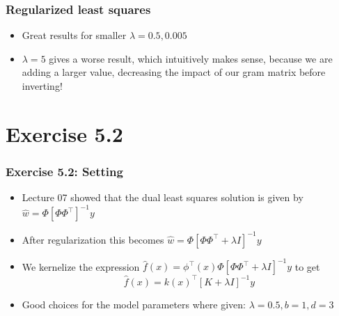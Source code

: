 \documentclass[10pt,aspectratio=169,handout]{beamer}
\begin{document}
\begin{frame}
\begin{minipage}{0.32\textwidth}
    \end{minipage}
\end{frame}

\begin{frame}
    \frametitle{Regularized least squares}

    \begin{itemize}
        \item Great results for smaller $\lambda=0.5,0.005$
        \item $\lambda=5$ gives a worse result, which intuitively makes sense, because we are adding a larger value, decreasing the impact of our gram matrix before inverting!
    \end{itemize}

\end{frame}

\section{Exercise 5.2}

\begin{frame}
    \frametitle{Exercise 5.2: Setting}

    \begin{itemize}
        \item Lecture 07 showed that the dual least squares solution is given by $\hat{w}=\Phi[\Phi\Phi^\intercal]^{-1}y$
        \item After regularization this becomes $\hat{w}=\Phi[\Phi\Phi^\intercal+\lambda I]^{-1}y$
        \item We kernelize the expression $\hat{f}(x)=\phi^\intercal(x)\Phi[\Phi\Phi^\intercal+\lambda I]^{-1}y$ to get \[\hat{f}(x)=k(x)^\intercal[K+\lambda I]^{-1}y\]
        \item Good choices for the model parameters where given: $\lambda=0.5,b=1,d=3$
    \end{itemize}

\end{frame}
\end{document}
